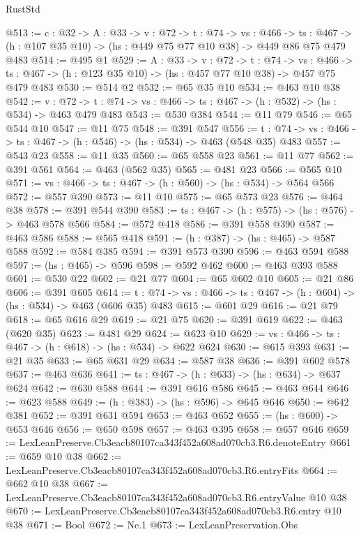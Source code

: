 \begin{lexlean}{RustStd}
\begin{coremodule}
@513 := {c : @32} ->
  {A : @33} ->
  {v : @72} ->
  {t : @74} ->
  {vs : @466} ->
  {ts : @467} -> (h : @107 @35 @10) -> (hs : @449 @75 @77 @10 @38) -> @449 @86 @75 @479 @483
@514 := @495 @1
@529 := {A : @33} ->
  {v : @72} ->
  {t : @74} ->
  {vs : @466} -> {ts : @467} -> (h : @123 @35 @10) -> (hs : @457 @77 @10 @38) -> @457 @75 @479 @483
@530 := @514 @2
@532 := @65 @35 @10
@534 := @463 @10 @38
@542 := {v : @72} ->
  {t : @74} -> {vs : @466} -> {ts : @467} -> (h : @532) -> (hs : @534) -> @463 @479 @483
@543 := @530 @384
@544 := @11 @79
@546 := @65 @544 @10
@547 := @11 @75
@548 := @391 @547
@556 := {t : @74} -> {vs : @466} -> {ts : @467} -> (h : @546) -> (hs : @534) -> @463 (@548 @35) @483
@557 := @543 @23
@558 := @11 @35
@560 := @65 @558 @23
@561 := @11 @77
@562 := @391 @561
@564 := @463 (@562 @35)
@565 := @481 @23
@566 := @565 @10
@571 := {vs : @466} -> {ts : @467} -> (h : @560) -> (hs : @534) -> @564 @566
@572 := @557 @390
@573 := @11 @10
@575 := @65 @573 @23
@576 := @464 @38
@578 := @391 @544 @390
@583 := {ts : @467} -> (h : @575) -> (hs : @576) -> @463 @578 @566
@584 := @572 @418
@586 := @391 @558 @390
@587 := @463 @586
@588 := @565 @418
@591 := (h : @387) -> (hs : @465) -> @587 @588
@592 := @584 @385
@594 := @391 @573 @390
@596 := @463 @594 @588
@597 := (hs : @465) -> @596
@598 := @592 @462
@600 := @463 @393 @588
@601 := @530 @22
@602 := @21 @77
@604 := @65 @602 @10
@605 := @21 @86
@606 := @391 @605
@614 := {t : @74} -> {vs : @466} -> {ts : @467} -> (h : @604) -> (hs : @534) -> @463 (@606 @35) @483
@615 := @601 @29
@616 := @21 @79
@618 := @65 @616 @29
@619 := @21 @75
@620 := @391 @619
@622 := @463 (@620 @35)
@623 := @481 @29
@624 := @623 @10
@629 := {vs : @466} -> {ts : @467} -> (h : @618) -> (hs : @534) -> @622 @624
@630 := @615 @393
@631 := @21 @35
@633 := @65 @631 @29
@634 := @587 @38
@636 := @391 @602 @578
@637 := @463 @636
@641 := {ts : @467} -> (h : @633) -> (hs : @634) -> @637 @624
@642 := @630 @588
@644 := @391 @616 @586
@645 := @463 @644
@646 := @623 @588
@649 := (h : @383) -> (hs : @596) -> @645 @646
@650 := @642 @381
@652 := @391 @631 @594
@653 := @463 @652
@655 := (hs : @600) -> @653 @646
@656 := @650 @598
@657 := @463 @395
@658 := @657 @646
@659 := LexLeanPreserve.Cb3eacb80107ca343f452a608ad070cb3.R6.denoteEntry
@661 := @659 @10 @38
@662 := LexLeanPreserve.Cb3eacb80107ca343f452a608ad070cb3.R6.entryFits
@664 := @662 @10 @38
@667 := LexLeanPreserve.Cb3eacb80107ca343f452a608ad070cb3.R6.entryValue @10 @38
@670 := LexLeanPreserve.Cb3eacb80107ca343f452a608ad070cb3.R6.entry @10 @38
@671 := Bool
@672 := Ne.{1}
@673 := LexLeanPreservation.Obs

\end{coremodule}
\end{lexlean}

